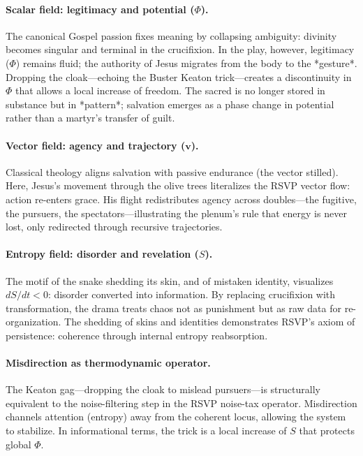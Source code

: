 \documentclass[12pt]{article}
\begin{document}
\paragraph{Scalar field: legitimacy and potential (\(\Phi\)).}
The canonical Gospel passion fixes meaning by collapsing ambiguity: divinity becomes singular and terminal in the crucifixion.  
In the play, however, legitimacy (\(\Phi\)) remains fluid; the authority of Jesus migrates from the body to the *gesture*.  
Dropping the cloak---echoing the Buster Keaton trick---creates a discontinuity in \(\Phi\) that allows a local increase of freedom.  
The sacred is no longer stored in substance but in *pattern*; salvation emerges as a phase change in potential rather than a martyr’s transfer of guilt.

\paragraph{Vector field: agency and trajectory (\(\mathbf v\)).}
Classical theology aligns salvation with passive endurance (the vector stilled).  
Here, Jesus’s movement through the olive trees literalizes the RSVP vector flow: action re-enters grace.  
His flight redistributes agency across doubles---the fugitive, the pursuers, the spectators---illustrating the plenum’s rule that energy is never lost, only redirected through recursive trajectories.

\paragraph{Entropy field: disorder and revelation (\(S\)).}
The motif of the snake shedding its skin, and of mistaken identity, visualizes \(dS/dt<0\): disorder converted into information.  
By replacing crucifixion with transformation, the drama treats chaos not as punishment but as raw data for re-organization.  
The shedding of skins and identities demonstrates RSVP’s axiom of persistence: coherence through internal entropy reabsorption.

\paragraph{Misdirection as thermodynamic operator.}
The Keaton gag---dropping the cloak to mislead pursuers---is structurally equivalent to the noise-filtering step in the RSVP noise-tax operator.  
Misdirection channels attention (entropy) away from the coherent locus, allowing the system to stabilize.  
In informational terms, the trick is a local increase of \(S\) that protects global \(\Phi\).
\end{document}
